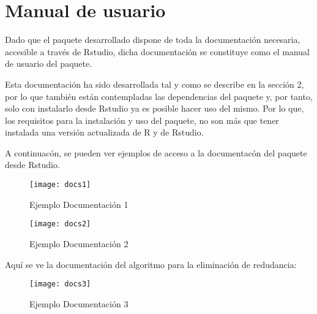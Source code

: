 \section{Manual de usuario}
Dado que el paquete desarrollado dispone de toda la documentaci\'on necesaria, accesible a trav\'es de Rstudio, dicha documentaci\'on se constituye como el manual de usuario del paquete. 

Esta documentaci\'on ha sido desarrollada tal y como se describe en la secci\'on 2, por lo que tambi\'en est\'an contempladas las dependencias del paquete y, por tanto, solo con instalarlo desde Rstudio ya es posible hacer uso del mismo. Por lo que, los requisitos para la instalaci\'on y uso del paquete, no son m\'as que tener instalada una versi\'on actualizada de R y de Rstudio.

A continuac\'on, se pueden ver ejemplos de acceso a la documentac\'on del paquete desde Rstudio.
\begin{figure}[H]
    \centering
    \texttt{[image: docs1]}
    \caption{Ejemplo Documentaci\'on 1}
    \label{fig:docs1}
\end{figure}

\begin{figure}[H]
    \centering
    \texttt{[image: docs2]}
    \caption{Ejemplo Documentaci\'on 2}
    \label{fig:docs2}
\end{figure}

Aqu\'i se ve la documentaci\'on del algoritmo para la eliminaci\'on de redudancia:
\begin{figure}[H]
    \centering
    \texttt{[image: docs3]}
    \caption{Ejemplo Documentaci\'on 3}
    \label{fig:docs3}
\end{figure}
\newpage